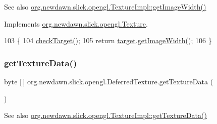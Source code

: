 \begin{DoxySeeAlso}{See also}
\mbox{\hyperlink{classorg_1_1newdawn_1_1slick_1_1opengl_1_1_texture_impl_a2f52648ca0e408f5b5f7c34a71634a26}{org.\+newdawn.\+slick.\+opengl.\+Texture\+Impl\+::get\+Image\+Width()}} 
\end{DoxySeeAlso}


Implements \mbox{\hyperlink{interfaceorg_1_1newdawn_1_1slick_1_1opengl_1_1_texture_a7dadcef354aaed97a0fe03f1978ee5f8}{org.\+newdawn.\+slick.\+opengl.\+Texture}}.


\begin{DoxyCode}
103                                \{
104         \mbox{\hyperlink{classorg_1_1newdawn_1_1slick_1_1opengl_1_1_deferred_texture_a22f14bcd9cbd4bf033e2308b90464dce}{checkTarget}}();
105         \textcolor{keywordflow}{return} \mbox{\hyperlink{classorg_1_1newdawn_1_1slick_1_1opengl_1_1_deferred_texture_aa70a4b195d0b965a0099d0e7bc18d9d2}{target}}.\mbox{\hyperlink{classorg_1_1newdawn_1_1slick_1_1opengl_1_1_texture_impl_a2f52648ca0e408f5b5f7c34a71634a26}{getImageWidth}}();
106     \}
\end{DoxyCode}
\mbox{\label{classorg_1_1newdawn_1_1slick_1_1opengl_1_1_deferred_texture_a074da894ed12bfc8058c8bd65133a8c5}} 
\subsubsection{\texorpdfstring{get\+Texture\+Data()}{getTextureData()}}
{\footnotesize\ttfamily byte \mbox{[}$\,$\mbox{]} org.\+newdawn.\+slick.\+opengl.\+Deferred\+Texture.\+get\+Texture\+Data (\begin{DoxyParamCaption}{ }\end{DoxyParamCaption})\hspace{0.3cm}{\ttfamily [inline]}}

\begin{DoxySeeAlso}{See also}
\mbox{\hyperlink{classorg_1_1newdawn_1_1slick_1_1opengl_1_1_texture_impl_a1420a28b8b562c79d6053c927cc58f20}{org.\+newdawn.\+slick.\+opengl.\+Texture\+Impl\+::get\+Texture\+Data()}} 
\end{DoxySeeAlso}


